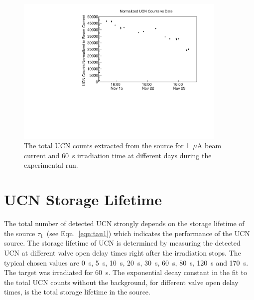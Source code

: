 \begin{figure}[h]
  \centering
  \includegraphics[width=0.9\textwidth]{UCNCounts_vs_time.pdf}
  \caption[ UCN yield at 1~$\mu$A beam current and 60~s target
  irradiation over experimental run]{The total UCN counts extracted
    from the source for 1~$\mu$A beam current and 60~s irradiation
    time at different days during the experimental run. }
  \label{fig:UCNCounts_time}
\end{figure}

\section{UCN Storage Lifetime~\label{storagelifetime}}

The total number of detected UCN strongly depends on the storage
lifetime of the source $\tau_1$~(see Eqn.~\ref{eqn:tau1}) which
indicates the performance of the UCN source. The storage lifetime of
UCN is determined by measuring the detected UCN at different valve
open delay times right after the irradiation stops.  The typical
chosen values are 0~s, 5~s, 10~s, 20~s, 30~s, 60~s, 80~s, 120~s and
170~s. The target was irradiated for 60~s.
The exponential decay constant in the fit to the total UCN counts
without the background, for different valve open delay times, is the
total storage lifetime in the source.

